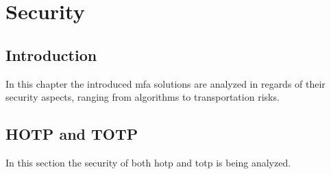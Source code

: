 \chapter{Security}

\section{Introduction}

In this chapter the introduced \gls{mfa} solutions are analyzed in regards of their security aspects, ranging from algorithms to transportation risks.

\section{HOTP and TOTP}

In this section the security of both \gls{hotp} and \gls{totp} is being analyzed.

